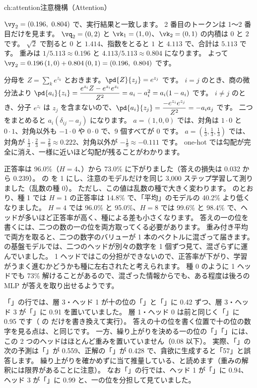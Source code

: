 \begin{answers}{ch:attention}{注意機構（Attention）}
\item $\vy_2=(0.196,\ 0.804)$ で、実行結果と一致します。
2 番目のトークンは 1〜2 番目だけを見ます。
$\vq_2=(0,2)$ と $\vk_1=(1,0)$、$\vk_2=(0,1)$ の内積は $0$ と $2$ です。
$\sqrt2$ で割ると $0$ と $1.414$、指数をとると $1$ と $4.113$ で、合計は $5.113$ です。
重みは $1/5.113\approx0.196$ と $4.113/5.113\approx0.804$ になります。
よって $\vy_2=0.196\,(1,0)+0.804\,(0,1)=(0.196,\ 0.804)$ です。

\item 分母を $Z=\sum_k e^{z_k}$ とおきます。$\pd{Z}{z_j}=e^{z_j}$ です。
$i=j$ のとき、商の微分法より $\pd{a_i}{z_i}=\dfrac{e^{z_i}Z-e^{z_i}e^{z_i}}{Z^2}=a_i-a_i^2=a_i(1-a_i)$ です。
$i\ne j$ のとき、分子 $e^{z_i}$ は $z_j$ を含まないので、$\pd{a_i}{z_j}=\dfrac{-e^{z_i}e^{z_j}}{Z^2}=-a_ia_j$ です。
二つをまとめると $a_i(\delta_{ij}-a_j)$ になります。
$a=(1,0,0)$ では、対角は $1\cdot0$ と $0\cdot1$、対角以外も $-1\cdot0$ や $0\cdot0$ で、9 個すべてが 0 です。
$a=(\frac13,\frac13,\frac13)$ では、対角が $\frac13\cdot\frac23=\frac29\approx0.222$、対角以外が $-\frac19\approx-0.111$ です。
one-hot では勾配が完全に消え、一様に近いほど勾配が残ることがわかります。

\item 正答率は 96.0\%（$H=4$、）から 73.0\% に下がりました（答えの損失は 0.032 から 0.239）。
 の  を 1 にし、注意のモデルだけを同じ 3,000 ステップ学習して測りました（乱数の種 0）。
ただし、この値は乱数の種で大きく変わります。
のとおり、種 1 では $H=1$ の正答率は 14.8\% で、「平均」のモデルの 40.2\% より低くなりました。
$H=4$ では 96.0\% と 95.0\%、$H=8$ では 99.6\% と 98.4\% で、ヘッドが多いほど正答率が高く、種による差も小さくなります。
答えの一の位を書くには、二つの数の一の位を両方取ってくる必要があります。
重み付き平均で両方を取ると、二つの数字のバリューが 1 本のベクトルに混ざって届きます。
の基盤モデルでは、二つのヘッドが別々の数字を 1 個ずつ見て、混ざらずに運んでいました。
1 ヘッドではこの分担ができないので、正答率が下がり、学習がうまく進むかどうかも種に左右されたと考えられます。
種 0 のように 1 ヘッドでも 73\% 解けることがあるので、混ざった情報からでも、ある程度は後ろの MLP が答えを取り出せるようです。

\item 「\code{=}」の行では、層 3・ヘッド 1 が十の位の「」と「」に 0.42 ずつ、層 3・ヘッド 3 が「」に 0.91 を置いていました。
層 1・ヘッド 0 は前と同じく「\code{=}」に 0.95 です（ の  だけを書き換えて実行）。
答えの十の位を書く位置で十の位の数字を見る点は、と同じです。
一方、繰り上がりを決める一の位の「」「」には、この 2 つのヘッドはほとんど重みを置いていません（0.08 以下）。
実際、「\code{=}」の次の予測は「」が 0.559、正解の「」が 0.428 で、貪欲に生成すると「57」と誤答します。
繰り上がりを確かめずに当て推量している、と読めます（重みの解釈には限界があることに注意）。
なお「」の行では、ヘッド 1 が「」に 0.94、ヘッド 3 が「」に 0.99 と、一の位を分担して見ていました。


\end{answers}
